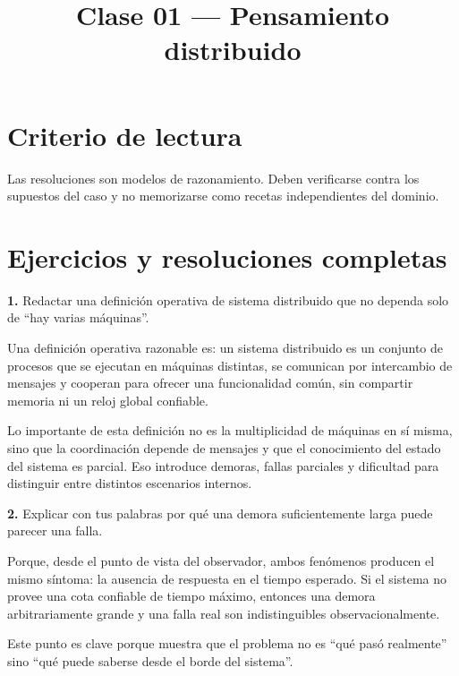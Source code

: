 \documentclass[variant=guia,cover=institutional,mode=screen]{ua-engineering-v6-article}
\title{Clase 01 --- Pensamiento distribuido}
\author{\UAProfessor}
\date{\UADate}
\begin{document}
\section{Criterio de lectura}
Las resoluciones son modelos de razonamiento. Deben verificarse contra los supuestos del caso y no memorizarse como recetas independientes del dominio.

\section{Ejercicios y resoluciones completas}
\begin{uaexercise}
\textbf{1.}
Redactar una definición operativa de sistema distribuido que no dependa solo de “hay varias máquinas”.
\end{uaexercise}
\begin{uaanswer}
Una definición operativa razonable es: un sistema distribuido es un conjunto de procesos que se ejecutan en máquinas distintas, se comunican por intercambio de mensajes y cooperan para ofrecer una funcionalidad común, sin compartir memoria ni un reloj global confiable.

Lo importante de esta definición no es la multiplicidad de máquinas en sí misma, sino que la coordinación depende de mensajes y que el conocimiento del estado del sistema es parcial.
Eso introduce demoras, fallas parciales y dificultad para distinguir entre distintos escenarios internos.
\end{uaanswer}

\begin{uaexercise}
\textbf{2.}
Explicar con tus palabras por qué una demora suficientemente larga puede parecer una falla.
\end{uaexercise}
\begin{uaanswer}
Porque, desde el punto de vista del observador, ambos fenómenos producen el mismo síntoma: la ausencia de respuesta en el tiempo esperado.
Si el sistema no provee una cota confiable de tiempo máximo, entonces una demora arbitrariamente grande y una falla real son indistinguibles observacionalmente.

Este punto es clave porque muestra que el problema no es “qué pasó realmente” sino “qué puede saberse desde el borde del sistema”.
\end{uaanswer}
\end{document}
